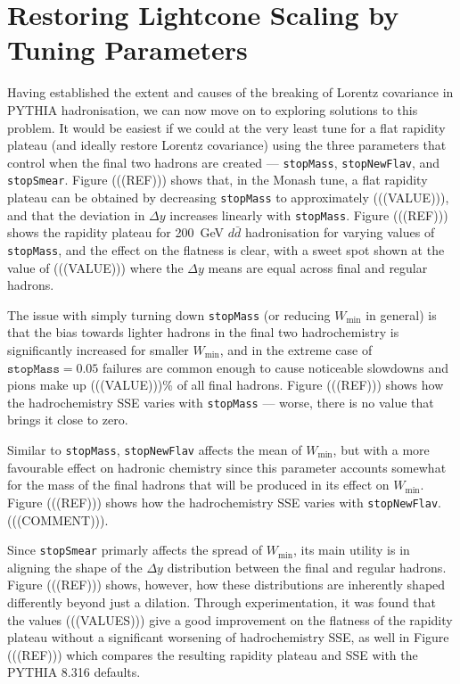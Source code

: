 \documentclass[12pt,a4paper]{report}
\begin{document}
\section{Restoring Lightcone Scaling by Tuning Parameters}
Having established the extent and causes of the breaking of Lorentz covariance in PYTHIA hadronisation, we can now move on to exploring solutions to this problem. It would be easiest if we could at the very least tune for a flat rapidity plateau (and ideally restore Lorentz covariance) using the three parameters that control when the final two hadrons are created --- \texttt{stopMass}, \texttt{stopNewFlav}, and \texttt{stopSmear}. Figure (((REF))) shows that, in the Monash tune, a flat rapidity plateau can be obtained by decreasing \texttt{stopMass} to approximately (((VALUE))), and that the deviation in $\Delta y$ increases linearly with \texttt{stopMass}. Figure (((REF))) shows the rapidity plateau for \qty{200}{\giga\electronvolt} $d\bar{d}$ hadronisation for varying values of \texttt{stopMass}, and the effect on the flatness is clear, with a sweet spot shown at the value of (((VALUE))) where the $\Delta y$ means are equal across final and regular hadrons.

The issue with simply turning down \texttt{stopMass} (or reducing $W_\text{min}$ in general) is that the bias towards lighter hadrons in the final two hadrochemistry is significantly increased for smaller $W_\text{min}$, and in the extreme case of $\texttt{stopMass} = 0.05$ failures are common enough to cause noticeable slowdowns and pions make up (((VALUE)))\% of all final hadrons. Figure (((REF))) shows how the hadrochemistry SSE varies with \texttt{stopMass} --- worse, there is no value that brings it close to zero.

Similar to \texttt{stopMass}, \texttt{stopNewFlav} affects the mean of $W_\text{min}$, but with a more favourable effect on hadronic chemistry since this parameter accounts somewhat for the mass of the final hadrons that will be produced in its effect on $W_\text{min}$. Figure (((REF))) shows how the hadrochemistry SSE varies with \texttt{stopNewFlav}. (((COMMENT))).

Since \texttt{stopSmear} primarly affects the spread of $W_\text{min}$, its main utility is in aligning the shape of the $\Delta y$ distribution between the final and regular hadrons. Figure (((REF))) shows, however, how these distributions are inherently shaped differently beyond just a dilation. Through experimentation, it was found that the values (((VALUES))) give a good improvement on the flatness of the rapidity plateau without a significant worsening of hadrochemistry SSE, as well in Figure (((REF))) which compares the resulting rapidity plateau and SSE with the PYTHIA 8.316 defaults.
\end{document}
